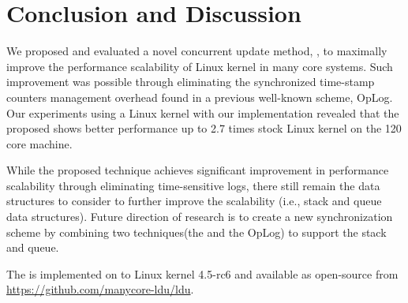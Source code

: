 \section{Conclusion and Discussion}
\label{sec:concl}
We proposed and evaluated a novel concurrent update method, \LDU, 
to maximally improve the performance scalability of Linux kernel 
in many core systems. 
Such improvement was possible through eliminating the 
synchronized time-stamp counters management overhead 
found in a previous well-known scheme, OpLog.
Our experiments using a Linux kernel with our \LDU implementation
revealed that the proposed \LDU shows better performance up to 2.7 times
stock Linux kernel on the 120 core machine.

While the proposed technique achieves significant improvement
in performance scalability through eliminating time-sensitive
logs, there still remain the data structures to consider to further
improve the scalability (i.e., stack and queue data structures).
Future direction of research is to create a new synchronization scheme by combining 
two techniques(the \LDU and the OpLog) to support the stack and queue.

The \LDU is implemented on to Linux kernel 4.5-rc6 and available as open-source
from \url{https://github.com/manycore-ldu/ldu}.

